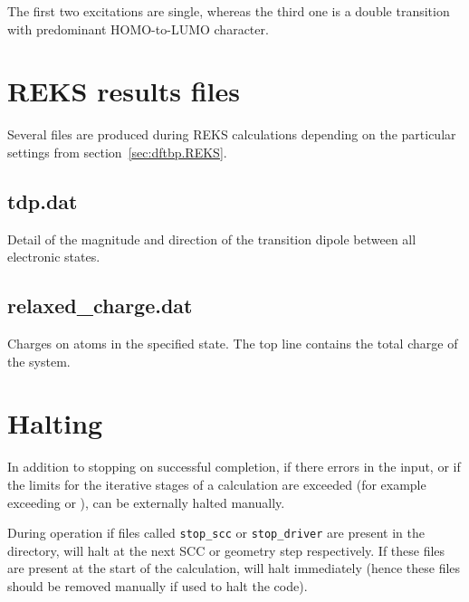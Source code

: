 The first two excitations are single, whereas the third one is a
double transition with predominant HOMO-to-LUMO character.

\section{REKS results files}
\label{sec:reks_files}
Several files are produced during REKS calculations depending on the
particular settings from section~\ref{sec:dftbp.REKS}.


\subsection{tdp.dat}

Detail of the magnitude and direction of the transition dipole between all electronic states.

\subsection{relaxed\_charge.dat}

Charges on atoms in the specified state. The top line contains the total charge
of the system.

\section{Halting \dftbp{}}
\label{sec:dftbp.HaltFiles}

In addition to stopping on successful completion, if there errors in the input,
or if the limits for the iterative stages of a calculation are exceeded (for
example exceeding  or ), \dftbp{} can be
externally halted manually.

During operation if files called \texttt{stop\_scc} or
\texttt{stop\_driver} are present in the directory, \dftbp{}
will halt at the next SCC or geometry step respectively. If these files are
present at the start of the calculation, \dftbp{} will halt immediately (hence
these files should be removed manually if used to halt the code).

